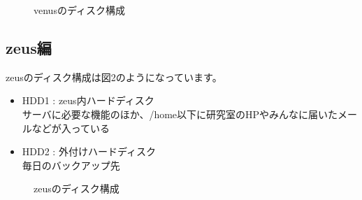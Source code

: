 \documentclass[11pt]{jarticle}
\begin{document}
\begin{figure}[h]
  \begin{center}
    \caption{venusのディスク構成 \label{fig:venus-hdd}}
  \end{center}
\end{figure}



\subsection{zeus編}

zeusのディスク構成は図2のようになっています。


\begin{itemize}
\item HDD1 : zeus内ハードディスク \\
      サーバに必要な機能のほか、/home以下に研究室のHPやみんなに届いたメールなどが入っている
\item HDD2 : 外付けハードディスク \\
      毎日のバックアップ先
\end{itemize}


\begin{figure}[h]
  \begin{center}
    \caption{zeusのディスク構成 \label{fig:zeus-hdd}}
  \end{center}
\end{figure}
\end{document}
